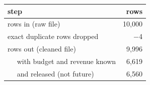\begin{tabular}{lr}
\toprule
step & rows \\
\midrule
rows in (raw file) & 10{,}000 \\
exact duplicate rows dropped & $-$4 \\
rows out (cleaned file) & 9{,}996 \\
$\quad$ with budget and revenue known & 6{,}619 \\
$\quad$ and released (not future) & 6{,}560 \\
\bottomrule
\end{tabular}
